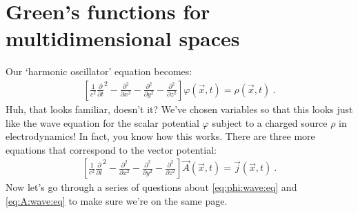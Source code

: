 \documentclass[
  11pt,
	colorful,
	raggedright,
]{tufte-style-thesis-flip}
\begin{document}
\section{Green's functions for multidimensional spaces}
Our `harmonic oscillator' equation becomes:
\begin{align}
  \left[\frac{1}{c^2}
      \frac{\partial}{\partial t}^2
      -
      \frac{\partial^2}
      {\partial x^2}
      -
      \frac{\partial^2}
      {\partial y^2}
      -
      \frac{\partial^2}
      {\partial z^2}
    \right]
    \varphi(\vec{x},t) = \rho(\vec{x},t) \ .
    \label{eq:phi:wave:eq}
\end{align}
Huh, that looks familiar, doesn't it? We've chosen variables so that this looks just like the wave equation for the scalar potential $\varphi$ subject to a charged source $\rho$ in electrodynamics! In fact, you know how this works. There are three more equations that correspond to the vector potential:
\begin{align}
  \left[\frac{1}{c^2}
      \frac{\partial}{\partial t}^2
      -
      \frac{\partial^2}
      {\partial x^2}
      -
      \frac{\partial^2}
      {\partial y^2}
      -
      \frac{\partial^2}
      {\partial z^2}
    \right]
    \vec A(\vec{x},t) = \vec j(\vec{x},t) \ .
    \label{eq:A:wave:eq}
\end{align}
Now let's go through a series of questions about \eqref{eq:phi:wave:eq} and \eqref{eq:A:wave:eq} to make sure we're on the same page. 
\end{document}
